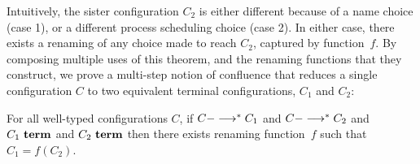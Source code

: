 Intuitively, the sister configuration $C_2$ is either different
because of a name choice (case 1), or a different process scheduling choice
(case 2).  In either case, there exists a renaming of any choice made
to reach $C_2$, captured by function~$f$.
%
By composing multiple uses of this theorem, and the renaming functions
that they construct, we prove a multi-step notion of confluence that 
reduces a single configuration $C$ to two equivalent terminal configurations,
 $C_1$ and $C_2$:

\begin{theorem}
For all well-typed configurations $C$,
%
 if $C --->^\ast C_1$ 
and $C --->^\ast C_2$ 
and $C_1~\textbf{term}$
and $C_2~\textbf{term}$
then 
there exists renaming function~$f$ 
such that $C_1 = f(C_2)$.
\end{theorem}
